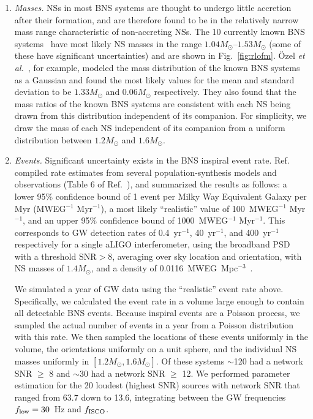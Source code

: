\documentclass[twocolumn,prd,amssymb,aps,nofootinbib,showpacs,epsf]{revtex4}
\begin{document}
\begin{enumerate}
\item \textit{Masses.} NSs in most BNS systems are thought to undergo little accretion after their formation, and are therefore found to be in the relatively narrow mass range characteristic of non-accreting NSs. The 10 currently known BNS systems~\cite{Lattimer2012} have most likely NS masses in the range $1.04M_\odot$--$1.53M_\odot$ (some of these have significant uncertainties) and are shown in Fig.~\ref{fig:rlofm}. \"Ozel {\it et al.}~\cite{OzelPsaltisNarayan2012}, for example, modeled the mass distribution of the known BNS systems as a Gaussian and found the most likely values for the mean and standard deviation to be $1.33M_\odot$ and $0.06M_\odot$ respectively. They also found that the mass ratios of the known BNS systems are consistent with each NS being drawn from this distribution independent of its companion. For simplicity, we draw the mass of each NS independent of its companion from a uniform distribution between $1.2M_\odot$ and $1.6M_\odot$. 

\item \textit{Events.} Significant uncertainty exists in the BNS inspiral event rate. Ref.~\cite{LIGORate2010} compiled rate estimates from several population-synthesis models and observations (Table 6 of Ref.~\cite{LIGORate2010}), and summarized the results as follows: a lower 95\% confidence bound of 1 event per Milky Way Equivalent Galaxy per Myr (MWEG$^{-1}$ Myr$^{-1}$), a most likely ``realistic'' value of 100~MWEG$^{-1}$ Myr$^{-1}$, and an upper 95\% confidence bound of 1000~MWEG$^{-1}$ Myr$^{-1}$. This corresponds to GW detection rates of 0.4~yr$^{-1}$, 40~yr$^{-1}$, and 400~yr$^{-1}$ respectively for a single aLIGO interferometer, using the broadband PSD with a threshold $\text{SNR} > 8$, averaging over sky location and orientation, with NS masses of $1.4M_\odot$, and a density of 0.0116~MWEG~Mpc$^{-3}$~\cite{LIGORate2010}. 

We simulated a year of GW data using the ``realistic'' event rate above. Specifically, we calculated the event rate in a volume large enough to contain all detectable BNS events. Because inspiral events are a Poisson process, we sampled the actual number of events in a year from a Poisson distribution with this rate. We then sampled the locations of these events uniformly in the volume, the orientations uniformly on a unit sphere, and the individual NS masses uniformly in $[1.2M_\odot, 1.6M_\odot]$. Of these systems $\sim$120 had a network SNR $\ge$ 8 and $\sim$30 had a network SNR $\ge$ 12. We performed parameter estimation for the 20 loudest (highest SNR) sources with network SNR that ranged from 63.7 down to 13.6, integrating between the GW frequencies $f_{\rm low} = 30$~Hz and $f_{\rm ISCO}$.


\end{enumerate}
\end{document}

